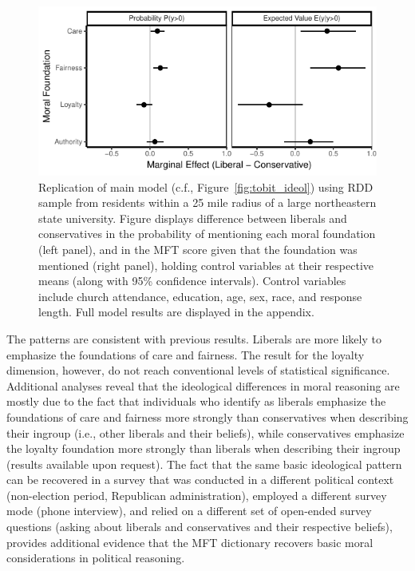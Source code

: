 \documentclass[12pt]{article}
\begin{document}
\begin{figure}[ht]\centering
\includegraphics{../calc/fig/tobit_ideol_lisurvey.pdf}
\caption{Replication of main model (c.f., Figure~\ref{fig:tobit_ideol}) using RDD sample from residents within a 25 mile radius of a large northeastern  state university. Figure displays difference between liberals and conservatives in the probability of mentioning each moral foundation (left panel), and in the MFT score given that the foundation was mentioned (right panel), holding control variables at their respective means (along with 95\% confidence intervals). Control variables include church attendance, education, age, sex, race, and response length. Full model results are displayed in the appendix.
}\label{fig:tobit_ideol_lisurvey}
\end{figure}

The patterns are consistent with previous results. Liberals are more likely to emphasize the foundations of care and fairness. The result for the loyalty dimension, however, do not reach conventional levels of statistical significance. Additional analyses reveal that the ideological differences in moral reasoning are mostly due to the fact that individuals who identify as liberals emphasize the foundations of care and fairness more strongly than conservatives when describing their ingroup (i.e., other liberals and their beliefs), while conservatives emphasize the loyalty foundation more strongly than liberals when describing their ingroup (results available upon request). The fact that the same basic ideological pattern can be recovered in a survey that was conducted in a different political context (non-election period, Republican administration), employed a different survey mode (phone interview), and relied on a different set of open-ended survey questions (asking about liberals and conservatives and their respective beliefs), provides additional evidence that the MFT dictionary recovers basic moral considerations in political reasoning.
\end{document}
